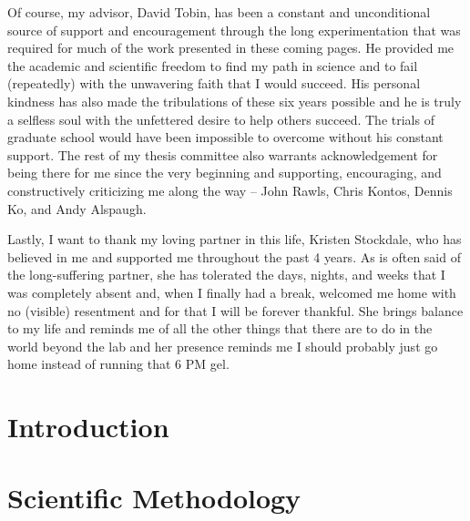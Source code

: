 \documentclass[PhD]{dukethesis2006}
\begin{document}
\begin{doublespace}
Of course, my advisor, David Tobin, has been a constant and unconditional source of support and encouragement through the long experimentation that was required for much of the work presented in these coming pages. He provided me the academic and scientific freedom to find my path in science and to fail (repeatedly) with the unwavering faith that I would succeed. His personal kindness has also made the tribulations of these six years possible and he is truly a selfless soul with the unfettered desire to help others succeed. The trials of graduate school would have been impossible to overcome without his constant support. The rest of my thesis committee also warrants acknowledgement for being there for me since the very beginning and supporting, encouraging, and constructively criticizing me along the way -- John Rawls, Chris Kontos, Dennis Ko, and Andy Alspaugh.

Lastly, I want to thank my loving partner in this life, Kristen Stockdale, who has believed in me and supported me throughout the past 4 years. As is often said of the long-suffering partner, she has tolerated the days, nights, and weeks that I was completely absent and, when I finally had a break, welcomed me home with no (visible) resentment and for that I will be forever thankful. She brings balance to my life and reminds me of all the other things that there are to do in the world beyond the lab and her presence reminds me I should probably just go home instead of running that 6 PM gel.

\end{doublespace}

\tableofcontents


\chapter{Introduction}\label{intro}

\begin{doublespace}

\end{doublespace}

\chapter{Scientific Methodology}\label{methods}
\end{document}
